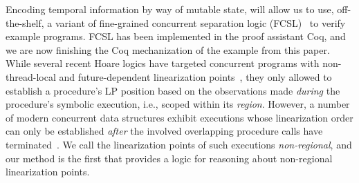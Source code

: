 Encoding temporal information by way of mutable state, will allow us
to use, off-the-shelf, a variant of fine-grained concurrent separation
logic (FCSL)~\cite{Sergey-al:ESOP15} to verify example programs.  FCSL
has been implemented in the proof assistant Coq, and we are now
finishing the Coq mechanization of the example from this paper. 
%
While several recent Hoare logics have targeted concurrent programs
with non-thread-local and future-dependent linearization
points~\cite{Liang-Feng:PLDI13,Turon-al:ICFP13}, they only allowed to
establish a procedure's LP position based on the observations made
\emph{during} the procedure's symbolic execution, i.e., scoped within
its \emph{region}.
%
However, a number of modern concurrent data structures exhibit
executions whose linearization order can only be established
\emph{after} the involved overlapping procedure calls have
terminated~\cite{Dodds-al:POPL15,Jayanti:STOC05}. We call the
linearization points of such executions \emph{non-regional}, and our
method is the first that provides a logic for reasoning about
non-regional linearization points.

\begin{comment}
Without going into details of separation logic, whose understanding is
not required for this paper, we mention that we inherit from
separation logic, and generalize, two important mechanisms. First,
where separation logic allows framing of heaps (i.e., extending the
heap that the procedure manipulates without changing the underlying
proof), we will allow framing of time (i.e., extending the history
that the procedure manipulates), which will lead to particularly
concise specifications.
Second, we inherit the mechanism for reasoning about programs with
nested parallel composition (i.e., dynamic, well-bracketed, forking
and joining). Such programs are easy for us to handle, but are not
often considered in the work on linearizability, where programs are
typically a \emph{top-level} parallel composition of a fixed number of
\emph{sequential} threads.
\end{comment}


